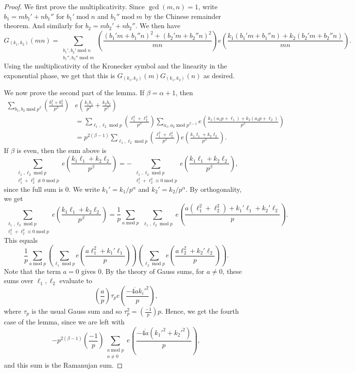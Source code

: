 \documentclass[10pt,a4paper]{amsart}
\def\gcd{\operatorname{gcd}}
\def\mod{\operatorname{mod}}
\begin{document}
\begin{proof}
    We first prove the multiplicativity. Since $\gcd(m,n)=1$, write $b_1 = m b_1'+ nb_1'' $ for $b_1' \mod n$ and $b_1'' \mod m$ by the Chinese remainder theorem. And similarly for $b_2=m b_2' + n b_2''$. We then have
    $$G_{(k_1,k_2)}(mn) = \sum_{\substack{b_1', b_2' \mod n \\ b_1'',b_2'' \mod m}}\left(\frac{(b_1' m+ b_1''n)^2+(b_2' m + b_2''n)^2}{mn} \right) e\left( \frac{k_1(b_1' m + b_1'' n) + k_2 (b_2' m + b_2'' n)}{mn} \right). $$
    Using the multiplicativity of the Kronecker symbol and the linearity in the exponential phase, we get that this is $G_{(k_1,k_2)}(m) G_{(k_1,k_2)}(n)$ as desired.

    We now prove the second part of the lemma. If $\beta=\alpha + 1$, then
    \begin{align*}
    \sum_{b_1,b_2 \mod p^{\beta}} \left( \frac{b_1^2+b_2^2}{p^{\beta}} \right) &e\left( \frac{k_1 b_1}{p^{\beta}} + \frac{k_2 b_2}{p^{\beta}}\right) \\
    &= \sum_{\ell_1 , \ell_2 \mod p} \left( \frac{\ell_1^2+\ell_2^2}{p^{\beta}} \right) \sum_{a_1 , a_2 \mod p^{\beta-1}} e\left( \frac{k_1 (a_1p + \ell_1) + k_2 (a_2p + \ell_2)}{p^{\beta}} \right) \\
    &= p^{2(\beta-1)} \sum_{\ell_1 , \ell_2 \mod p} \left( \frac{\ell_1^2+\ell_2^2}{p^{\beta}} \right) e\left( \frac{k_1 \ell_1 + k_2 \ell_2}{p^{\beta}} \right).
    \end{align*}
    If $\beta$ is even, then the sum above is
    $$ \sum_{\substack{\ell_1 , \ell_2 \mod p \\ \ell_1^2+\ell_2^2 \not\equiv 0 \mod p}} e\left( \frac{k_1 \ell_1 + k_2 \ell_2}{p^{\beta}} \right) = - \sum_{\substack{\ell_1 , \ell_2 \mod p \\ \ell_1^2+\ell_2^2 \equiv 0 \mod p}} e\left( \frac{k_1 \ell_1 + k_2 \ell_2}{p^{\beta}} \right) ,$$
    since the full sum is 0. We write $k_1'=k_1/p^{\alpha}$ and $k_2'= k_2/p^{\alpha}$. By orthogonality, we get
    $$ \sum_{\substack{\ell_1 , \ell_2 \mod p \\ \ell_1^2+\ell_2^2 \equiv 0 \mod p}} e\left( \frac{k_1 \ell_1 + k_2 \ell_2}{p^{\beta}} \right) = \frac{1}{p} \sum_{a\mod p}\sum_{\substack{\ell_1 , \ell_2 \mod p}} e\left( \frac{a(\ell_1^2+\ell_2^2) + k_1' \ell_1 + k_2' \ell_2}{p} \right) .$$
    This equals
    $$ \frac{1}{p}\sum_{a\mod p} \left( \sum_{\ell_1 \mod p} e\left( \frac{a\ell_1^2+ k_1'\ell_1}{p} \right) \right) \left(\sum_{\ell_2 \mod p} e\left( \frac{a\ell_2^2+ k_2'\ell_2}{p} \right) \right) . $$
    Note that the term $a=0$ gives $0$. By the theory of Gauss sums, for $a\not=0$, these sums over $\ell_1, \ell_2$ evaluate to
    $$ \left( \frac{a}{p} \right) \tau_p e\left( \frac{-\overline{4a}k_i'^2}{p} \right), $$
    where $\tau_p$ is the usual Gauss sum and so $\tau_p^2 = \left( \frac{-1}{p} \right)p$.
    Hence, we get the fourth case of the lemma, since we are left with
    $$ - p^{2(\beta-1)} \left( \frac{-1}{p} \right) \sum_{\substack{a \mod p \\ a\not= 0}}e\left( \frac{-\overline{4a}(k_1'^2+k_2'^2)}{p} \right) , $$
    and this sum is the Ramanujan sum.


\end{proof}
\end{document}
